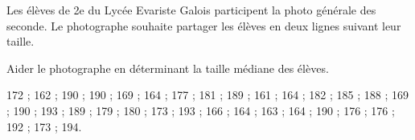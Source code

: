 
Les élèves de 2e du Lycée Evariste Galois participent la photo générale des seconde. Le photographe souhaite partager les élèves en deux lignes suivant leur taille. 

Aider le photographe en déterminant la taille médiane des élèves.

172 ; 162 ; 190 ; 190 ; 169 ; 164 ; 177 ; 181 ;
189 ; 161 ; 164 ; 182 ; 185 ; 188 ; 169 ; 190 ;
193 ; 189 ; 179 ; 180 ; 173 ; 193 ; 166 ; 164 ;
163 ; 164 ; 190 ; 176 ; 176 ; 192 ; 173 ; 194.